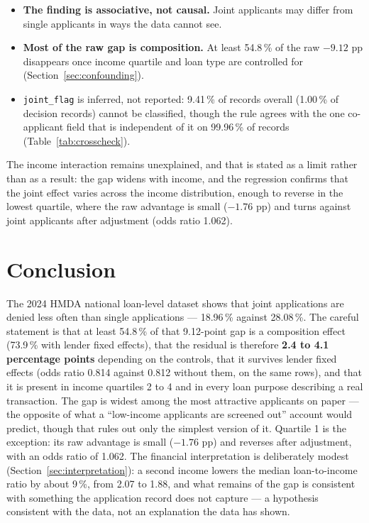 \documentclass[sigconf,balance=false]{acmart}
\begin{document}
\begin{itemize}
  \item \textbf{The finding is associative, not causal.} Joint applicants
        may differ from single applicants in ways the data cannot see.
  \item \textbf{Most of the raw gap is composition.} At least 54.8\,\% of
        the raw $-9.12$ pp disappears once income quartile and loan type are
        controlled for (Section~\ref{sec:confounding}).
  \item \texttt{joint\_\allowbreak flag} is inferred, not reported:
        9.41\,\% of records overall (1.00\,\% of decision records) cannot
        be classified, though the rule agrees with the one co-applicant
        field that is independent of it on 99.96\,\% of records
        (Table~\ref{tab:crosscheck}).
\end{itemize}

The income interaction remains unexplained, and that is stated as a limit
rather than as a result: the gap widens with income, and the regression
confirms that the joint effect varies across the income distribution, enough
to reverse in the lowest quartile, where the raw advantage is small
($-1.76$ pp) and turns against joint applicants after adjustment (odds
ratio 1.062).

\section{Conclusion}

The 2024 HMDA national loan-level dataset shows that joint applications are
denied less often than single applications --- 18.96\,\% against 28.08\,\%.
The careful statement is that at least 54.8\,\% of that 9.12-point gap is a
composition effect (73.9\,\% with lender fixed effects), that the residual
is therefore \textbf{2.4 to 4.1 percentage points} depending on the
controls, that it survives lender fixed effects (odds ratio 0.814 against
0.812 without them, on the same rows), and that it is present in income
quartiles 2 to 4 and in every loan purpose describing a real transaction.
The gap is widest among the most attractive applicants on paper --- the
opposite of what a ``low-income applicants are screened out'' account would
predict, though that rules out only the simplest version of it. Quartile 1
is the exception: its raw advantage is small ($-1.76$ pp) and reverses after
adjustment, with an odds ratio of 1.062. The financial interpretation is
deliberately modest (Section~\ref{sec:interpretation}): a second income
lowers the median loan-to-income ratio by about 9\,\%, from 2.07 to 1.88,
and what remains of the gap is consistent with something the application
record does not capture --- a hypothesis consistent with the data, not an
explanation the data has shown.
\end{document}
